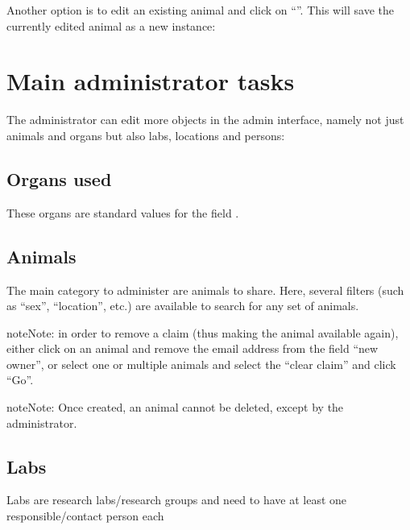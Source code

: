 \documentclass[letterpaper,10pt,openany,oneside,english]{sphinxmanual}
\begin{document}
\noindent{}

Another option is to edit an existing animal and click on “”. This will save the
currently edited animal as a new instance:

\noindent{}


\section{Main administrator tasks}
\label{\detokenize{index:main-administrator-tasks}}
The administrator can edit more objects in the admin interface, namely not just animals and organs
but also labs, locations and persons:

\noindent{}


\subsection{Organs used}
\label{\detokenize{index:organs-used}}
These organs are standard values for the field .


\subsection{Animals}
\label{\detokenize{index:id3}}
The main category to administer are animals to share.
Here, several filters (such as “sex”, “location”, etc.) are available to search for any set of animals.

\noindent{}

\begin{sphinxadmonition}{note}{Note:}
in order to remove a claim (thus making the animal available again), either click on an animal
and remove the email address from the field “new owner”, or select one or multiple animals and
select the “clear claim”  and click “Go”.
\end{sphinxadmonition}

\begin{sphinxadmonition}{note}{Note:}
Once created, an animal cannot be deleted, except by the administrator.
\end{sphinxadmonition}


\subsection{Labs}
\label{\detokenize{index:labs}}
Labs are research labs/research groups and need to have at least one responsible/contact person each
\end{document}
